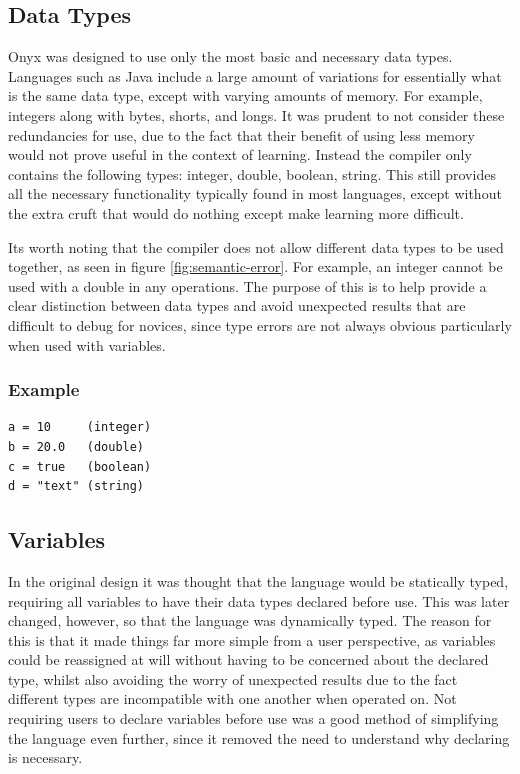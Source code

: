 \documentclass[
]{report}
\begin{document}
\subsection{Data Types}
Onyx was designed to use only the most basic and necessary data types.
Languages such as Java include a large amount of variations for
essentially what is the same data type, except with varying amounts of
memory. For example, integers along with bytes, shorts, and longs. It
was prudent to not consider these redundancies for use, due to the fact
that their benefit of using less memory would not prove useful in the
context of learning. Instead the compiler only contains the following
types: integer, double, boolean, string. This still provides all the
necessary functionality typically found in most languages, except
without the extra cruft that would do nothing except make learning more
difficult.

Its worth noting that the compiler does not allow different data types
to be used together, as seen in figure \ref{fig:semantic-error}. For example, 
an integer cannot be used with a double in any operations. The purpose of 
this is to help provide a clear distinction between data types and avoid 
unexpected results that are difficult to debug for novices, since type errors 
are not always obvious particularly when used with variables.

\subsubsection{Example}
\begin{verbatim}
a = 10     (integer)
b = 20.0   (double)
c = true   (boolean)
d = "text" (string)
\end{verbatim}

\subsection{Variables}
In the original design it was thought that the language would be
statically typed, requiring all variables to have their data types
declared before use. This was later changed, however, so that the
language was dynamically typed. The reason for this is that it made
things far more simple from a user perspective, as variables could be
reassigned at will without having to be concerned about the declared
type, whilst also avoiding the worry of unexpected results due to the
fact different types are incompatible with one another when operated on.
Not requiring users to declare variables before use was a good method of
simplifying the language even further, since it removed the need to
understand why declaring is necessary.
\end{document}
